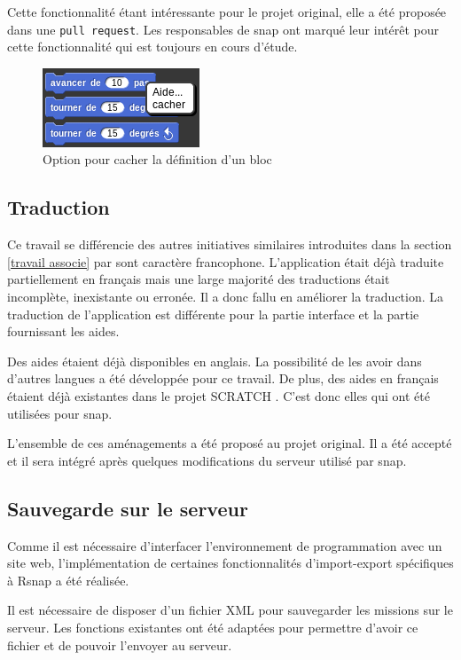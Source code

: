 Cette fonctionnalité étant intéressante pour le projet original, elle a été proposée dans une \texttt{pull request}. Les responsables de \gls{snap} ont marqué leur intérêt pour cette fonctionnalité qui est toujours en cours d'étude.
\begin{figure}
  \begin{center}
    \includegraphics[scale=0.5]{content/7-solution/2-snap/images/cacher}
    \caption{Option pour cacher la définition d'un bloc}
    \label{fig:cacher}
  \end{center}
\end{figure}

\subsection{Traduction}
Ce travail se différencie des autres initiatives similaires introduites dans la section \ref{travail associe} par sont caractère francophone. L'application était déjà traduite partiellement en français mais une large majorité des traductions était incomplète, inexistante ou erronée. Il a donc fallu en améliorer la traduction. La traduction de l'application est différente pour la partie interface et la partie fournissant les aides.

Des aides étaient déjà disponibles en anglais. La possibilité de les avoir dans d'autres langues a été développée pour ce travail. De plus, des aides en français étaient déjà existantes dans le projet SCRATCH \cite{scratch-translation}. C'est donc elles qui ont été utilisées pour \gls{snap}.

L'ensemble de ces aménagements a été proposé au projet original. Il a été accepté et il sera intégré après quelques modifications du serveur utilisé par \gls{snap}.

\subsection{Sauvegarde sur le serveur}
Comme il est nécessaire d'interfacer l'environnement de programmation avec un site web, l'implémentation de certaines fonctionnalités d'import-export spécifiques à \gls{Rsnap} a été réalisée.

Il est nécessaire de disposer d'un fichier XML pour sauvegarder les missions sur le serveur. Les fonctions existantes ont été adaptées pour permettre d'avoir ce fichier et de pouvoir l'envoyer au serveur.
